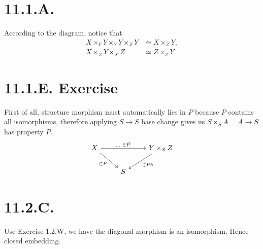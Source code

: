 \section{11.1.A.}

According to the diagram, notice that 
\begin{align*}
    X\times_Y Y \times_Y Y\times_Z Y &\simeq X\times_Z Y,\\
    X\times_Z Y \times_X Z &\simeq Z\times_Z Y.
\end{align*}

\section{11.1.E. Exercise}

First of all, structure morphism must automatically lies in $P$ because $P$ contains all isomorphisms, therefore applying $S\to S$ base change gives us $S\times_S A=A\to S$ has property $P$. 
\[%
\begin{tikzcd}
X \arrow[rd, "\in P"'] \arrow[rr, "\therefore ~\in P"] &   & Y\times_S Z \arrow[ld, "\in P\delta"] \\
                                                       & S &                                      
\end{tikzcd}\] 

\section{11.2.C.}

Use Exercise 1.2.W, we have the diagonal morphism is an isomorphism. Hence closed embedding.